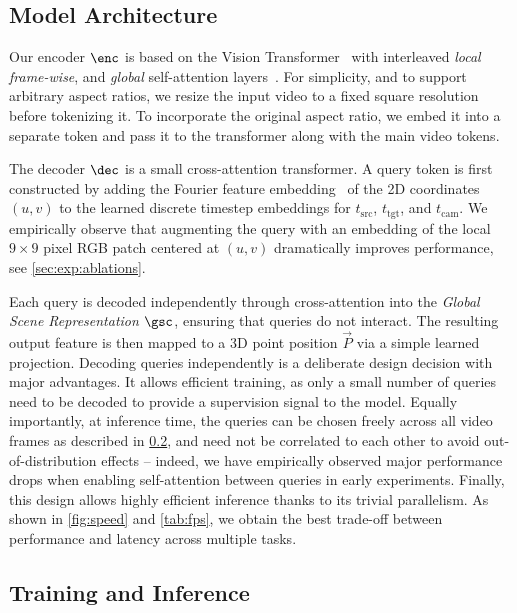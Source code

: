 


\subsection{Model Architecture}
\label{sec:method:architecture}


Our encoder $\enc$ is based on the Vision Transformer~\cite{dosovitskiy2021} with interleaved \emph{local frame-wise}, and \emph{global} self-attention layers~\cite{wang2025vggt}.
For simplicity, and to support arbitrary aspect ratios, we resize the input video to a fixed square resolution before tokenizing it.
To incorporate the original aspect ratio, we embed it into a separate token and pass it to the transformer along with the main video tokens.


The decoder $\dec$ is a small cross-attention transformer.
A query token is first constructed by adding the Fourier feature embedding~\cite{AttentionIsAllYouNeed} of the 2D coordinates $(u, v)$ to the learned discrete timestep embeddings for $t_\text{src}$, $t_\text{tgt}$, and $t_\text{cam}$.
We empirically observe that augmenting the query with an embedding of the local $9{\times}9$ pixel RGB patch centered at $(u, v)$ dramatically improves performance, see \cref{sec:exp:ablations}.

Each query is decoded independently through cross-attention into the \emph{Global Scene Representation} $\gsc$, ensuring that queries do not interact.
The resulting output feature is then mapped to a 3D point position $\vec{P}$ via a simple learned projection.
Decoding queries independently is a deliberate design decision with major advantages.
It allows efficient training, as only a small number of queries need to be decoded to provide a supervision signal to the model.
Equally importantly, at inference time, the queries can be chosen freely across all video frames as described in \cref{sec:method:training}, and need not be correlated to each other to avoid out-of-distribution effects -- indeed, we have empirically observed major performance drops when enabling self-attention between queries in early experiments.
Finally, this design allows highly efficient inference thanks to its trivial parallelism.
As shown in \cref{fig:speed} and \cref{tab:fps}, we obtain the best trade-off between performance and latency across multiple tasks.





\subsection{Training and Inference}
\label{sec:method:training}

